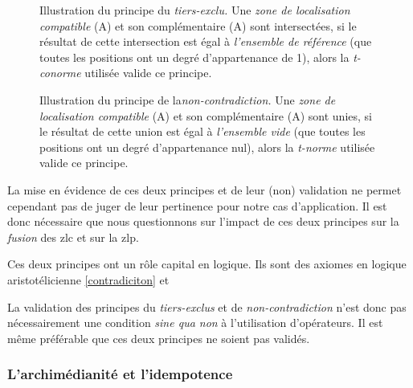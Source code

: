 \begin{figure}
  \centering
  
  \caption[Illustration du principe du
  \emph{tiers-exclu}]{Illustration du principe du \emph{tiers-exclu.}
    Une \emph{zone de localisation compatible}
    (\textcolor{RdBu-9-1}{\textsf{A}}) et son complémentaire
    (\textcolor{RdBu-9-9}{\textsf{A}}) sont intersectées, si le
    résultat de cette intersection est égal à \emph{l'ensemble de
      référence} (\ie que toutes les positions ont un degré
    d'appartenance de 1), alors la \emph{t-conorme} utilisée valide ce
    principe.}
  \label{fig:tiers-exclu}
\end{figure}

\begin{figure}
  \centering
  
  \caption[Illustration du principe de la
  \emph{non-contradiction}]{Illustration du principe de
    la\emph{non-contradiction.}  Une \emph{zone de localisation
      compatible} (\textcolor{RdBu-9-1}{\textsf{A}}) et son
    complémentaire (\textcolor{RdBu-9-9}{\textsf{A}}) sont
    unies, si le résultat de cette union est égal à \emph{l'ensemble
      vide} (\ie que toutes les positions ont un degré d'appartenance
    nul), alors la \emph{t-norme} utilisée valide ce principe.}
  \label{fig:non-contradiction}
\end{figure}

La mise en évidence de ces deux principes et de leur (non) validation
ne permet cependant pas de juger de leur pertinence pour notre cas
d’application. Il est donc nécessaire que nous questionnons sur
l'impact de ces deux principes sur la \emph{fusion} des \ac{zlc} et
sur la \ac{zlp}.

Ces deux principes ont un rôle capital en logique. Ils sont des
axiomes en logique aristotélicienne \autoref{contradiciton} et 

La validation des principes du \emph{tiers-exclus} et de
\emph{non-contradiction} n'est donc pas nécessairement une condition
\emph{sine qua non} à l'utilisation d'opérateurs. Il est même
préférable que ces deux principes ne soient pas validés.

\subsubsection{L'archimédianité et l’idempotence}

